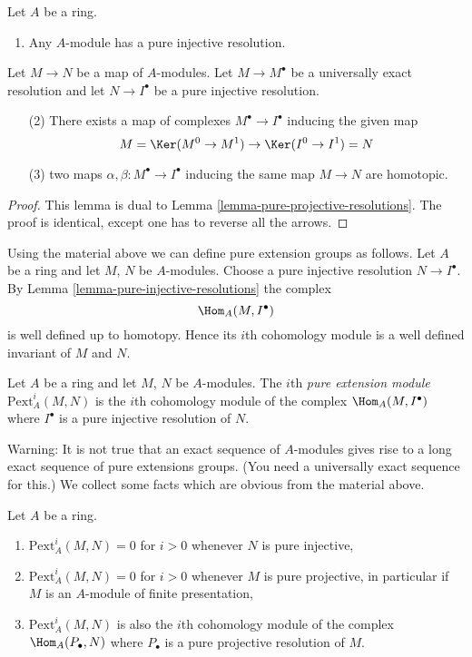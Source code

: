 \begin{lemma}
\label{lemma-pure-injective-resolutions}
Let $A$ be a ring.
\begin{enumerate}
\item Any $A$-module has a pure injective resolution.
\end{enumerate}
Let $M \to N$ be a map of $A$-modules.
Let $M \to M^\bullet$ be a universally exact resolution and
let $N \to I^\bullet$ be a pure injective resolution.
\begin{enumerate}
\item[(2)] There exists a map of complexes $M^\bullet \to I^\bullet$
inducing the given map
$$
M = \Ker(M^0 \to M^1) \to \Ker(I^0 \to I^1) = N
$$
\item[(3)] two maps $\alpha, \beta : M^\bullet \to I^\bullet$
inducing the same map $M \to N$ are homotopic.
\end{enumerate}
\end{lemma}

\begin{proof}
This lemma is dual to
Lemma \ref{lemma-pure-projective-resolutions}.
The proof is identical, except one has to reverse all the arrows.
\end{proof}

\noindent
Using the material above we can define pure extension groups as
follows. Let $A$ be a ring and let $M$, $N$ be $A$-modules.
Choose a pure injective resolution $N \to I^\bullet$. By
Lemma \ref{lemma-pure-injective-resolutions}
the complex
$$
\Hom_A(M, I^\bullet)
$$
is well defined up to homotopy. Hence its $i$th cohomology module
is a well defined invariant of $M$ and $N$.

\begin{definition}
\label{definition-pure-ext}
Let $A$ be a ring and let $M$, $N$ be $A$-modules.
The $i$th {\it pure extension module} $\text{Pext}^i_A(M, N)$
is the $i$th cohomology module of the complex
$\Hom_A(M, I^\bullet)$ where $I^\bullet$ is a pure injective
resolution of $N$.
\end{definition}

\noindent
Warning: It is not true that an exact sequence of $A$-modules gives
rise to a long exact sequence of pure extensions groups. (You need
a universally exact sequence for this.)
We collect some facts which are obvious from the material above.

\begin{lemma}
\label{lemma-facts-pext}
Let $A$ be a ring.
\begin{enumerate}
\item $\text{Pext}^i_A(M, N) = 0$ for $i > 0$ whenever $N$ is pure injective,
\item $\text{Pext}^i_A(M, N) = 0$ for $i > 0$ whenever $M$ is pure projective,
in particular if $M$ is an $A$-module of finite presentation,
\item $\text{Pext}^i_A(M, N)$ is also the $i$th cohomology module
of the complex $\Hom_A(P_\bullet, N)$ where $P_\bullet$
is a pure projective resolution of $M$.
\end{enumerate}
\end{lemma}

